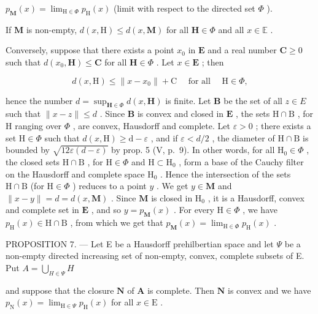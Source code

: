 \(p_{\mathbf{M}}(x) = \lim_{\mathrm{H}\in \Phi}p_{\mathrm{H}}(x)\) (limit with respect to the directed set \(\Phi\) ).

If \(\mathbf{M}\) is non-empty, \(d(x,\mathrm{H})\leqslant d(x,\mathbf{M})\) for all \(\mathbf{H}\in \Phi\) and all \(x\in \mathbb{E}\) .

Conversely, suppose that there exists a point \(x_0\) in \(\mathbf{E}\) and a real number \(\mathbf{C} \geqslant 0\) such that \(d(x_0, \mathbf{H}) \leqslant \mathbf{C}\) for all \(\mathbf{H} \in \Phi\) . Let \(x \in \mathbf{E}\) ; then

\[
d (x, \mathrm{H}) \leqslant \| x - x _ {0} \| + \mathrm{C} \quad \text { for   all } \quad \mathrm{H} \in \Phi ,
\]

hence the number \(d = \sup_{\mathbf{H} \in \Phi} d(x, \mathbf{H})\) is finite. Let \(\mathbf{B}\) be the set of all \(z \in E\) such that \(\| x - z\| \leqslant d\) . Since \(\mathbf{B}\) is convex and closed in \(\mathbf{E}\) , the sets \(\mathrm{H} \cap \mathrm{B}\) , for \(\mathrm{H}\) ranging over \(\Phi\) , are convex, Hausdorff and complete. Let \(\varepsilon > 0\) ; there exists a set \(\mathrm{H} \in \Phi\) such that \(d(x, \mathrm{H}) \geqslant \mathrm{d} - \varepsilon\) , and if \(\varepsilon < d/2\) , the diameter of \(\mathrm{H} \cap \mathrm{B}\) is bounded by \(\sqrt{12\varepsilon(d - \varepsilon)}\) by prop. 5 (V, p.~9). In other words, for all \(\mathrm{H}_0 \in \Phi\) , the closed sets \(\mathrm{H} \cap \mathrm{B}\) , for \(\mathrm{H} \in \Phi\) and \(\mathrm{H} \subset \mathrm{H}_0\) , form a base of the Cauchy filter on the Hausdorff and complete space \(\mathrm{H}_0\) . Hence the intersection of the sets \(\mathrm{H} \cap \mathrm{B}\) (for \(\mathrm{H} \in \Phi\) ) reduces to a point \(y\) . We get \(y \in \mathbf{M}\) and \(\| x - y \| = d = d(x, \mathbf{M})\) . Since \(\mathbf{M}\) is closed in \(\mathrm{H}_0\) , it is a Hausdorff, convex and complete set in \(\mathbf{E}\) , and so \(y = p_{\mathbf{M}}(x)\) . For every \(\mathrm{H} \in \Phi\) , we have \(p_{\mathrm{H}}(x) \in \mathrm{H} \cap \mathrm{B}\) , from which we get that \(p_{\mathbf{M}}(x) = \lim_{\mathrm{H} \in \Phi} p_{\mathrm{H}}(x)\) .

PROPOSITION 7. --- Let E be a Hausdorff prehilbertian space and let \(\Psi\) be a non-empty directed increasing set of non-empty, convex, complete subsets of E. Put \(A = \bigcup_{H \in \Psi} H\)

and suppose that the closure \(\mathbf{N}\) of \(\mathbf{A}\) is complete. Then \(\mathbf{N}\) is convex and we have \(p_{\mathrm{N}}(x) = \lim_{\mathrm{H}\in \Psi}p_{\mathrm{H}}(x)\) for all \(x\in \mathrm{E}\) .

